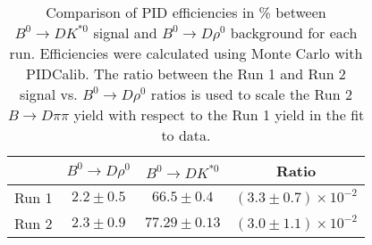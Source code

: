 \begin{table}
    \centering
    \begin{tabular}{cccc}
        \toprule
        & $B^0 \to D\rho^0$ & $B^0 \to DK^{*0}$ & Ratio \\
        \midrule
Run 1 & $2.2 \pm 0.5$ & $66.5 \pm 0.4$ & $(3.3 \pm 0.7) \times 10^{-2}$ \\
Run 2 & $2.3 \pm 0.9$ & $77.29 \pm 0.13$ & $(3.0 \pm 1.1) \times 10^{-2}$ \\
      \bottomrule
        \end{tabular}
        \caption{Comparison of PID efficiencies in \% between $B^0 \to DK^{*0}$ signal and $B^0 \to D\rho^0$ background for each run. Efficiencies were calculated using Monte Carlo with PIDCalib. The ratio between the Run 1 and Run 2 signal vs. $B^0 \to D\rho^0$ ratios is used to scale the Run 2 $B \to D\pi\pi$ yield with respect to the Run 1 yield in the fit to data.}
\label{tab:rho_PID_eff}
\end{table}

